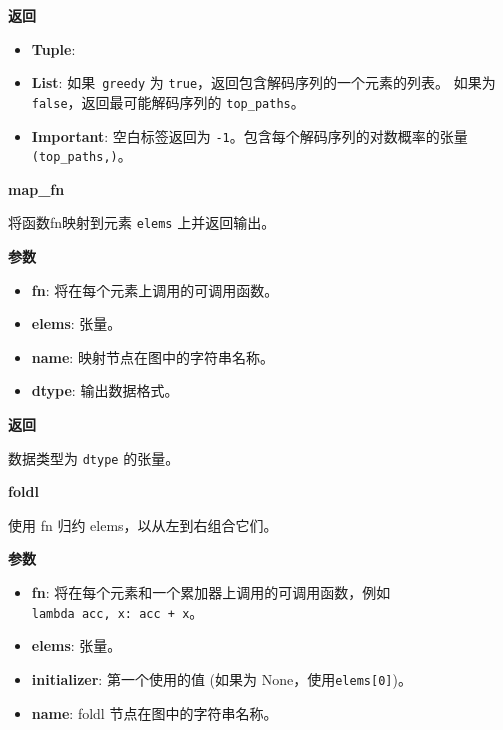\textbf{返回}

\begin{itemize}
\tightlist
\item
  \textbf{Tuple}:
\item
  \textbf{List}: 如果~\texttt{greedy} 为
  \texttt{true}，返回包含解码序列的一个元素的列表。 如果为
  \texttt{false}，返回最可能解码序列的 \texttt{top\_paths}。
\item
  \textbf{Important}: 空白标签返回为
  \texttt{-1}。包含每个解码序列的对数概率的张量 \texttt{(top\_paths,)}。
\end{itemize}


\textbf{map\_fn}\label{mapux5ffn}

\begin{Shaded}
\begin{Highlighting}[]
\OperatorTok{=}\OperatorTok{=}\NormalTok{)}
\end{Highlighting}
\end{Shaded}

将函数fn映射到元素 \texttt{elems} 上并返回输出。

\textbf{参数}

\begin{itemize}
\tightlist
\item
  \textbf{fn}: 将在每个元素上调用的可调用函数。
\item
  \textbf{elems}: 张量。
\item
  \textbf{name}: 映射节点在图中的字符串名称。
\item
  \textbf{dtype}: 输出数据格式。
\end{itemize}

\textbf{返回}

数据类型为 \texttt{dtype} 的张量。


\textbf{foldl}\label{foldl}

\begin{Shaded}
\begin{Highlighting}[]
\OperatorTok{=}\OperatorTok{=}\NormalTok{)}
\end{Highlighting}
\end{Shaded}

使用 fn 归约 elems，以从左到右组合它们。

\textbf{参数}

\begin{itemize}
\tightlist
\item
  \textbf{fn}: 将在每个元素和一个累加器上调用的可调用函数，例如
  \texttt{lambda\ acc,\ x:\ acc\ +\ x}。
\item
  \textbf{elems}: 张量。
\item
  \textbf{initializer}: 第一个使用的值 (如果为
  None，使用\texttt{elems{[}0{]}})。
\item
  \textbf{name}: foldl 节点在图中的字符串名称。
\end{itemize}

